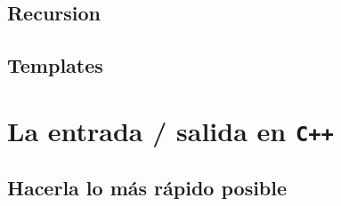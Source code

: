 \documentclass[12pt, fleqn]{report}                             %
\theoremstyle{break}                                            %
\newcommand{\textCode}[1]  { \texttt{#1} }                      %
\newcommand{\Cpp}{\ignorespaces\textCode{C++}}                  %
\begin{document}
                    \cite{shaharmikeLambdas}


            \subsection{Recursion}


            \subsection{Templates}


        \clearpage
        \section{La entrada / salida en \Cpp}

            \subsection{Hacerla lo más rápido posible}
\end{document}
